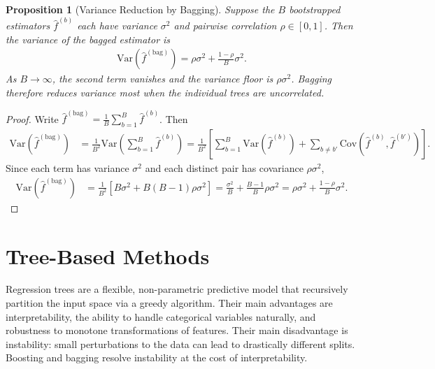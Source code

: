 \documentclass[11pt]{article}
\theoremstyle{definition}
\theoremstyle{plain}
\newtheorem{proposition}{Proposition}[section]
\theoremstyle{remark}
\begin{document}
\begin{proposition}[Variance Reduction by Bagging]\label{prop:bagging}
    Suppose the $B$ bootstrapped estimators $\hat{f}^{(b)}$ each have variance $\sigma^2$ and pairwise correlation $\rho \in [0,1]$. Then the variance of the bagged estimator is
    \begin{align}
        \text{Var}\!\left(\hat{f}^{(\text{bag})}\right) = \rho \sigma^2 + \frac{1-\rho}{B}\sigma^2.
    \end{align}
    As $B \to \infty$, the second term vanishes and the variance floor is $\rho\sigma^2$. Bagging therefore reduces variance most when the individual trees are uncorrelated.
\end{proposition}
\begin{proof}
    Write $\hat{f}^{(\text{bag})} = \frac{1}{B}\sum_{b=1}^B \hat{f}^{(b)}$. Then
    \begin{align}
        \text{Var}\!\left(\hat{f}^{(\text{bag})}\right) &= \frac{1}{B^2}\text{Var}\!\left(\sum_{b=1}^B \hat{f}^{(b)}\right) = \frac{1}{B^2}\left[\sum_{b=1}^B \text{Var}(\hat{f}^{(b)}) + \sum_{b \neq b'}\text{Cov}(\hat{f}^{(b)},\hat{f}^{(b')})\right].
    \end{align}
    Since each term has variance $\sigma^2$ and each distinct pair has covariance $\rho\sigma^2$,
    \begin{align}
        \text{Var}\!\left(\hat{f}^{(\text{bag})}\right) &= \frac{1}{B^2}\left[B\sigma^2 + B(B-1)\rho\sigma^2\right] = \frac{\sigma^2}{B} + \frac{B-1}{B}\rho\sigma^2 = \rho\sigma^2 + \frac{1-\rho}{B}\sigma^2.
    \end{align}
\end{proof}

\section{Tree-Based Methods}

Regression trees are a flexible, non-parametric predictive model that recursively partition the input space via a greedy algorithm. Their main advantages are interpretability, the ability to handle categorical variables naturally, and robustness to monotone transformations of features. Their main disadvantage is instability: small perturbations to the data can lead to drastically different splits. Boosting and bagging resolve instability at the cost of interpretability.
\end{document}
